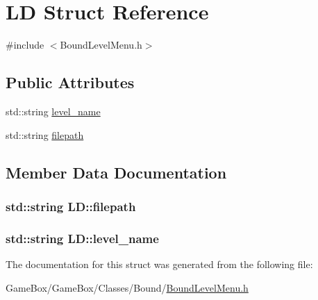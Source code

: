\hypertarget{struct_l_d}{\section{\-L\-D \-Struct \-Reference}
\label{struct_l_d}
}


{\ttfamily \#include $<$\-Bound\-Level\-Menu.\-h$>$}

\subsection*{\-Public \-Attributes}
\begin{DoxyCompactItemize}
\item 
std\-::string \hyperlink{struct_l_d_aa6b37791d70e12687247633a11143c7a}{level\-\_\-name}
\item 
std\-::string \hyperlink{struct_l_d_af926c9a4c205c12493e97ad03119bbc5}{filepath}
\end{DoxyCompactItemize}


\subsection{\-Member \-Data \-Documentation}
\hypertarget{struct_l_d_af926c9a4c205c12493e97ad03119bbc5}{
\subsubsection[{filepath}]{\setlength{\rightskip}{0pt plus 5cm}std\-::string {\bf \-L\-D\-::filepath}}}\label{struct_l_d_af926c9a4c205c12493e97ad03119bbc5}
\hypertarget{struct_l_d_aa6b37791d70e12687247633a11143c7a}{
\subsubsection[{level\-\_\-name}]{\setlength{\rightskip}{0pt plus 5cm}std\-::string {\bf \-L\-D\-::level\-\_\-name}}}\label{struct_l_d_aa6b37791d70e12687247633a11143c7a}


\-The documentation for this struct was generated from the following file\-:\begin{DoxyCompactItemize}
\item 
\-Game\-Box/\-Game\-Box/\-Classes/\-Bound/\hyperlink{_bound_level_menu_8h}{\-Bound\-Level\-Menu.\-h}\end{DoxyCompactItemize}
